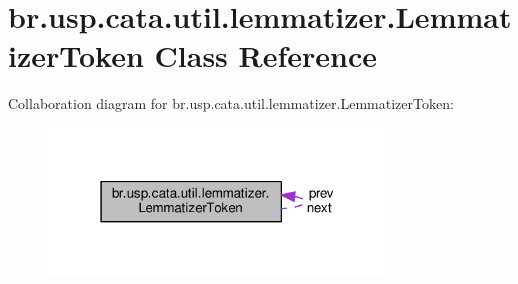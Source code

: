 \hypertarget{classbr_1_1usp_1_1cata_1_1util_1_1lemmatizer_1_1_lemmatizer_token}{\section{br.\+usp.\+cata.\+util.\+lemmatizer.\+Lemmatizer\+Token Class Reference}
\label{classbr_1_1usp_1_1cata_1_1util_1_1lemmatizer_1_1_lemmatizer_token}
}


Collaboration diagram for br.\+usp.\+cata.\+util.\+lemmatizer.\+Lemmatizer\+Token\+:\nopagebreak
\begin{figure}[H]
\begin{center}
\leavevmode
\includegraphics[width=255pt]{classbr_1_1usp_1_1cata_1_1util_1_1lemmatizer_1_1_lemmatizer_token__coll__graph}
\end{center}
\end{figure}
